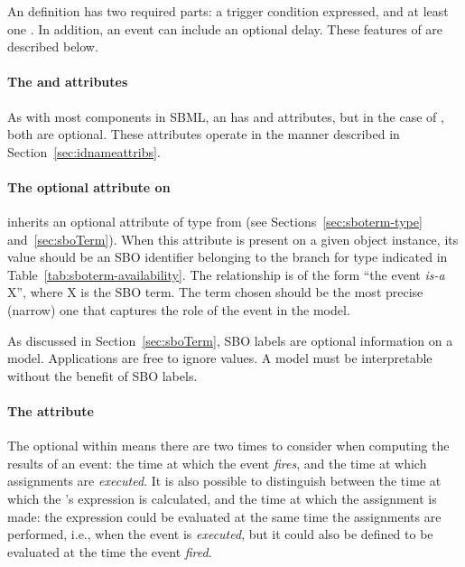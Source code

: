\subsubsection{}

An \Event definition has two required parts: a trigger condition
expressed, and at least one \EventAssignment.  In addition, an
event can include an optional delay.  These features of \Event are
described below.


\paragraph{The  and  attributes}
\label{sec:event-id-name}

As with most components in SBML, an \Event has  and
 attributes, but in the case of \Event, both are optional.
These attributes operate in the manner described in
Section~\ref{sec:idnameattribs}.


\paragraph{The optional  attribute on }
\label{sec:event-sboterm}

\Event inherits an optional  attribute of type
 from \SBase (see
Sections~\ref{sec:sboterm-type} and~\ref{sec:sboTerm}).  When this
attribute is present on a given \Event object instance, its value
should be an SBO identifier belonging to the branch for type
\Event indicated in Table~\ref{tab:sboterm-availability}.  The
relationship is of the form ``the event \emph{is-a} X'', where X
is the SBO term.  The term chosen should be the most precise
(narrow) one that captures the role of the event in the model.

As discussed in Section~\ref{sec:sboTerm}, SBO labels are optional
information on a model.  Applications are free to ignore
 values.  A model must be interpretable without the
benefit of SBO labels.


\paragraph{The  attribute}
\label{sec:event-usevaluesfromtriggertime}

The optional \Delay within \Event means there are two times to
consider when computing the results of an event: the time at which
the event \emph{fires}, and the time at which assignments are
\emph{executed}.  It is also possible to distinguish between the
time at which the \EventAssignment's expression is calculated, and
the time at which the assignment is made: the expression could be
evaluated at the same time the assignments are performed, i.e.,
when the event is \emph{executed}, but it could also be defined to
be evaluated at the time the event \emph{fired}.

